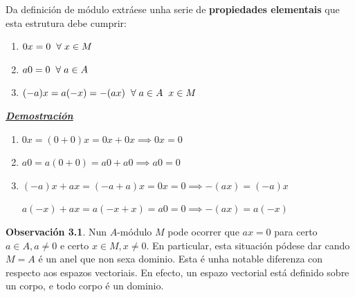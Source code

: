\documentclass[twoside]{report}
\theoremstyle{mystyle}
\begin{document}
\pagebreak

\noindent Da definición de módulo extráese unha serie de \textbf{propiedades elementais} que esta estrutura debe cumprir:

\renewcommand{\theenumi}{\roman{enumi})}
\renewcommand{\labelenumi}{\theenumi}

\begin{enumerate}
    \item $0x = 0 \hspace{2mm} \forall \hspace{1mm} x \in M$
    \item $a0 = 0 \hspace{2mm} \forall \hspace{1mm} a \in A$
    \item $(-a)x = a(-x) = -(ax) \hspace{2mm} \forall \hspace{1mm} a \in A \hspace{2mm} x \in M$
\end{enumerate}

\vspace{2mm}

\noindent \textbf{\textit{\underline{Demostración}}}

\vspace{2mm}

\begin{enumerate}
    \item  $0x = (0 + 0)x = 0x + 0x \implies 0x = 0$
    \item $a0 = a(0 + 0) = a0 + a0 \implies a0 = 0$
    \item $(-a)x + ax = (-a + a)x = 0x = 0 \implies -(ax) = (-a)x$ \par
    \vspace{1mm}
    $a(-x) + ax = a(-x + x) = a0 = 0 \implies -(ax) = a(-x)$
\end{enumerate}

\renewcommand{\theenumi}{\arabic{enumi}}
\renewcommand{\labelenumi}{\theenumi.}

\vspace{3mm}

\noindent \textbf{Observación 3.1}. Nun $A$-módulo $M$ pode ocorrer que $ax = 0$ para certo $a \in A, a \neq 0$ e certo $x \in M, x \neq 0$. En particular, esta situación pódese dar cando $M = A$ é un anel que non sexa dominio. Esta é unha notable diferenza con respecto aos espazos vectoriais. En efecto, un espazo vectorial está definido sobre un corpo, e todo corpo é un dominio.\\
\end{document}
